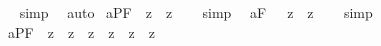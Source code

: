 \begin{isabellebody}
\isadelimproof
\ %
\endisadelimproof
%
\isatagproof
{}\isamarkupfalse%
\ simp\ \isamarkupfalse%
\ auto%
\endisatagproof
{\isafoldproof}%
%
\isadelimproof
%
\endisadelimproof
%
\isamarkuptrue%
%
\isamarkuptrue%
\isamarkupfalse%
\ a{}{}{\isacharunderscore}{}{\isacharunderscore}PF{\isacharcolon}\ {\isachardoublequoteopen}{\isacharbrackleft}{\isacharcomma}{\isasymphi}{\isacharcomma}\ {\isasymrightarrow}\isactrlsup z\ {\isacharparenleft}{\isacharcomma}{\isasymphi}{\isacharcomma}\ {\isasymrightarrow}\isactrlsup z\ {\isacharcomma}{\isasymphi}{\isacharcomma}{\isacharparenright}{\isacharbrackright}{\isachardoublequoteclose}%
\isadelimproof
\ %
\endisadelimproof
%
\isatagproof
{}\isamarkupfalse%
\ simp\ \isamarkupfalse%
%
\endisatagproof
{\isafoldproof}%
%
\isadelimproof
%
\endisadelimproof
\isanewline
{}\isamarkupfalse%
\ a{}{}{\isacharunderscore}{}{\isacharunderscore}F{\isacharcolon}\ \ {\isachardoublequoteopen}{\isacharbrackleft}{\isacharsemicolon}{\isasymphi}{\isacharsemicolon}\ {\isasymrightarrow}\isactrlsup z\ {\isacharparenleft}{\isacharsemicolon}{\isasymphi}{\isacharsemicolon}\ {\isasymrightarrow}\isactrlsup z\ {\isacharsemicolon}{\isasymphi}{\isacharsemicolon}{\isacharparenright}{\isacharbrackright}{\isachardoublequoteclose}%
\isadelimproof
\ %
\endisadelimproof
%
\isatagproof
{}\isamarkupfalse%
\ simp\ \isamarkupfalse%
%
\endisatagproof
{\isafoldproof}%
%
\isadelimproof
%
\endisadelimproof
\isanewline
{}\isamarkupfalse%
\ a{}{}{\isacharunderscore}{}{\isacharunderscore}PF{\isacharcolon}\ {\isachardoublequoteopen}{\isacharbrackleft}{\isacharparenleft}{\isacharcomma}{\isasymphi}{\isacharcomma}\ {\isasymrightarrow}\isactrlsup z\ {\isacharparenleft}{\isacharcomma}{\isasympsi}{\isacharcomma}\ {\isasymrightarrow}\isactrlsup z\ {\isacharcomma}{\isasymchi}{\isacharcomma}{\isacharparenright}{\isacharparenright}\ {\isasymrightarrow}\isactrlsup z\ {\isacharparenleft}{\isacharparenleft}{\isacharcomma}{\isasymphi}{\isacharcomma}\ {\isasymrightarrow}\isactrlsup z\ {\isacharcomma}{\isasympsi}{\isacharcomma}{\isacharparenright}\ {\isasymrightarrow}\isactrlsup z\ {\isacharparenleft}{\isacharcomma}{\isasymphi}{\isacharcomma}\ {\isasymrightarrow}\isactrlsup z\ {\isacharcomma}{\isasymchi}{\isacharcomma}{\isacharparenright}{\isacharparenright}{\isacharbrackright}{\isachardoublequoteclose}%

\end{isabellebody}
